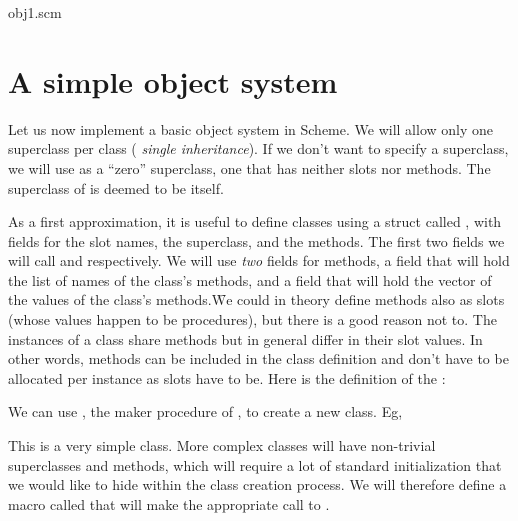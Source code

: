\scmfilename obj1.scm


\section{A simple object system}

Let us now implement a basic object system in Scheme.
We will allow only one superclass per class ({\em
single inheritance}).  If we don't want to specify a
superclass, we will use  as a ``zero''
superclass, one that has neither slots nor methods.
The superclass of  is deemed to be itself.

As a first approximation, it is useful to define
classes using a struct called , with
fields for the slot names, the superclass, and the
methods.  The first two fields we will call 
and  respectively.  We will use {\em two}
fields for methods, a
 field that will hold the list of names
of the class's methods, and a
 field that will hold the vector of
the values of the class's methods.\f{We could in theory
define methods also as slots (whose values happen to be
procedures), but there is a good reason not to.  The
instances of a class share methods but in general
differ in their slot values.  In other words, methods
can be included in the class definition and don't have
to be allocated per instance as slots have to be.}
Here is the definition of the :


\n We can use , the maker procedure of
, to create a new class.  Eg,


\n This is a very simple class.   More complex classes
will have non-trivial superclasses and methods, which
will require a lot of standard initialization that we
would like to hide within the class creation process.
We will therefore define a macro called
 that will make the appropriate call to
.



